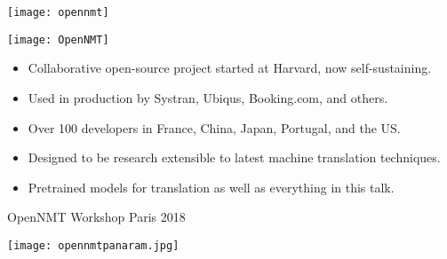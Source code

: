 \begin{frame}
  
  \begin{center}
    \texttt{[image: opennmt]}
  \end{center}

\end{frame}

\begin{frame}
  \begin{center}
    \texttt{[image: OpenNMT]}
  \end{center}

  \begin{itemize}
  \item Collaborative open-source project started at Harvard, now self-sustaining.
    \air 
  \item Used in production by Systran, Ubiqus, Booking.com, and others.
    \air
  \item Over 100 developers in France, China, Japan, Portugal, and the US.
    \air
  \item Designed to be research extensible to latest machine translation techniques. 
    \air

  \item Pretrained models for translation as well as everything in this talk.
  \end{itemize}
\end{frame}

\begin{frame}{OpenNMT Workshop} {Paris 2018}
  \begin{center}
    \hspace*{-9cm}\texttt{[image: opennmtpanaram.jpg]}
  \end{center}
\end{frame}
